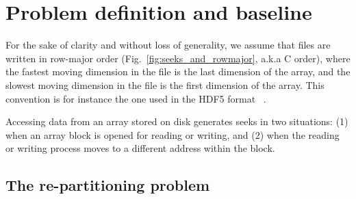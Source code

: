 \documentclass[sigconf, nonacm]{acmart}
\begin{document}
\section{Problem definition and baseline}


For the sake of clarity and without loss of generality, we assume that
 files are written in row-major order (Fig.~\ref{fig:seeks_and_rowmajor},
 a.k.a C order), where the fastest moving dimension in the file is the
 last dimension of the array, and the slowest moving dimension in the file
 is the first dimension of the array. This convention is for instance the
 one used in the HDF5 format ~\cite{hdf5}.

Accessing data from an array stored on disk generates seeks in two
situations: (1) when an array block is opened for reading or writing, and
(2) when the reading or writing process moves to a different address within
the block.

\subsection{The re-partitioning problem}
\end{document}

